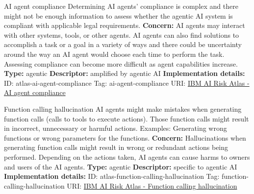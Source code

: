 \begin{definitionbox}{AI agent compliance}
Determining AI agents' compliance is complex and there might not be enough information to assess whether the agentic AI system is compliant with applicable legal requirements.\newline\newline
\textbf{Concern: }AI agents may interact with other systems, tools, or other agents. AI agents can also find solutions to accomplish a task or a goal in a variety of ways and there could be uncertainty around the way an AI agent would choose each time to perform the task. Assessing compliance can become more difficult as agent capabilities increase.\newline\newline
\textbf{Type: }agentic\newline
\textbf{Descriptor: }amplified by agentic AI \newline\newline
\textbf{Implementation details: } \newline
ID: atlas-ai-agent-compliance \newline
Tag: ai-agent-compliance \newline
URI:  \href{https://www.ibm.com/docs/en/watsonx/saas?topic=SSYOK8/wsj/ai-risk-atlas/ai-agent-compliance.html}{IBM AI Risk Atlas - AI agent compliance}\newline
\end{definitionbox}
\begin{definitionbox}{Function calling hallucination}
AI agents might make mistakes when generating function calls (calls to tools to execute actions). Those function calls might result in incorrect, unnecessary or harmful actions. Examples: Generating wrong functions or wrong parameters for the functions.\newline\newline
\textbf{Concern: }Hallucinations when generating function calls might result in wrong or redundant actions being performed. Depending on the actions taken, AI agents can cause harms to owners and users of the AI agents.\newline\newline
\textbf{Type: }agentic\newline
\textbf{Descriptor: }specific to agentic AI \newline\newline
\textbf{Implementation details: } \newline
ID: atlas-function-calling-hallucination \newline
Tag: function-calling-hallucination \newline
URI:  \href{https://www.ibm.com/docs/en/watsonx/saas?topic=SSYOK8/wsj/ai-risk-atlas/function-calling-hallucination.html}{IBM AI Risk Atlas - Function calling hallucination}\newline
\end{definitionbox}
